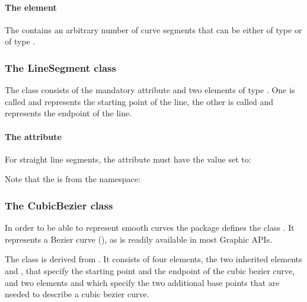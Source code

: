\paragraph{The  element} 
\label{listofcurvesegments-class} 

The  contains an arbitrary number of curve 
segments that can be either of type \LineSegment or of type 
\CubicBezier. 


\subsubsection{The LineSegment class} 
\label{linesegment-class} 

The \LineSegment class consists of the mandatory attribute 
 and two elements of type \Point. One is called 
 and represents the starting point of the line, the other 
is called  and represents the endpoint of the line. 

\paragraph {The  attribute} For straight line segments, 
the attribute  must have the value set to: 

\begin{center}
\end{center}

Note that the  is from the  namespace: 

\begin{center}
\end{center}

\subsubsection{The CubicBezier class}
\label{cubicbezier-class}
In order to be able to represent smooth curves the \Layout package 
defines the class \CubicBezier. It represents a Bezier curve (\cite{beziercurve}), 
as is readily available in most Graphic APIs. 

The class \CubicBezier is derived from \LineSegment. It consists of 
four elements, the two inherited elements  and , 
that specify the starting point and the endpoint of the cubic bezier curve, 
and two elements  and  which specify the 
two additional base points that are needed to describe a cubic bezier curve. 

